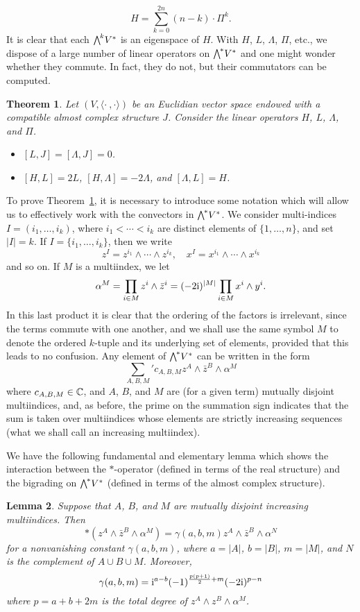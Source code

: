 \documentclass[11pt]{book}
\newtheorem{theorem}{Theorem}[section]
\newtheorem{lemma}[theorem]{Lemma}
\theoremstyle{definition}
\begin{document}
\[H=\sum_{k=0}^{2n}(n-k)\cdot\Pi^k.\]
It is clear that each $\bigw^kV^*$ is an eigenspace of $H$. With $H$, $L$, $\Lambda$, $\Pi$, etc., we dispose of a large number of linear operators on $\bigw^*V^*$ and one might wonder whether they commute. In fact, they do not, but their commutators can be computed.
\begin{theorem}\label{almost complex space sl(2,C) representation}
Let $(V,\langle\cdot\ ,\cdot\rangle)$ be an Euclidian vector space endowed with a compatible almost complex structure $J$. Consider the linear operators $H$, $L$, $\Lambda$, and $\Pi$.
\begin{itemize}
\item[(a)] $[L,J]=[\Lambda,J]=0$.
\item[(b)] $[H,L]=2L$, $[H,\Lambda]=-2\Lambda$, and $[\Lambda,L]=H$.
\end{itemize}
\end{theorem}
To prove Theorem~\ref{almost complex space sl(2,C) representation}, it is necessary to introduce some notation which will allow us to effectively work with the convectors in $\bigw^*V^*$. We consider multi-indices $I=(i_1,\dots,i_k)$, where $i_1<\cdots<i_k$ are distinct elements of $\{1,\dots,n\}$, and set $|I|=k$. If $I=\{i_1,\dots,i_k\}$, then we write
\[z^I=z^{i_1}\wedge\cdots\wedge z^{i_k},\quad x^I=x^{i_1}\wedge\cdots\wedge x^{i_k}\]
and so on. If $M$ is a multiindex, we let
\[\alpha^M=\prod_{i\in M}z^i\wedge\bar{z}^i=(-2\mathrm{i} )^{|M|}\prod_{i\in M}x^i\wedge y^i.\]
In this last product it is clear that the ordering of the factors is irrelevant, since the terms commute with one another, and we shall use the same symbol $M$ to denote the ordered $k$-tuple and its underlying set of elements, provided that this leads to no confusion. Any element of $\bigw^*V^*$ can be written in the form
\[\sum_{A,B,M}'c_{A,B,M}z^A\wedge\bar{z}^B\wedge\alpha^M\]
where $c_{A,B,M}\in\mathbb{C}$, and $A$, $B$, and $M$ are (for a given term) mutually disjoint multiindices, and, as before, the prime on the summation sign indicates that the sum is taken over multiindices whose elements are strictly increasing sequences (what we shall call an increasing multiindex).\par
We have the following fundamental and elementary lemma which shows the interaction between the $\ast$-operator (defined in terms of the real structure) and the bigrading on $\bigw^*V^*$ (defined in terms of the almost complex structure).
\begin{lemma}\label{almost complex space Hodge star on standard form lemma}
Suppose that $A$, $B$, and $M$ are mutually disjoint increasing multiindices. Then
\[\ast(z^A\wedge\bar{z}^B\wedge\alpha^M)=\gamma(a,b,m)z^A\wedge\bar{z}^B\wedge\alpha^N\]
for a nonvanishing constant $\gamma(a,b,m)$, where $a=|A|$, $b=|B|$, $m=|M|$, and $N$ is the complement of $A\cup B\cup M$. Moreover,
\[\gamma(a,b,m)=\mathrm{i}^{a-b}(-1)^{\frac{p(p+1)}{2}+m}(-2\mathrm{i})^{p-n}\]
where $p=a+b+2m$ is the total degree of $z^A\wedge z^B\wedge\alpha^M$.
\end{lemma}
\end{document}
